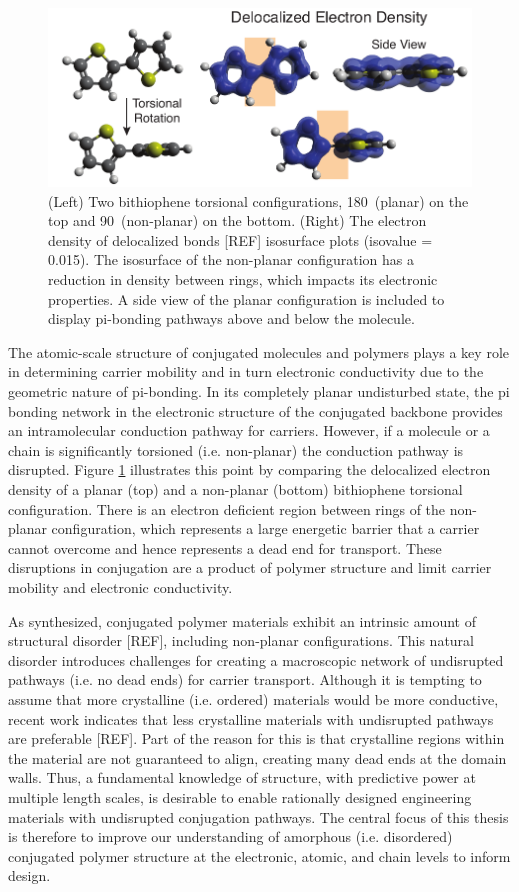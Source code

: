 \begin{figure}[hbt!]
  \includegraphics{figures/chap1_intro/figure_delocal_copy.pdf}
  \caption{(Left) Two bithiophene torsional configurations, 180\textdegree \  (planar) on the top and 90\textdegree \ (non-planar) on the bottom. (Right) The electron density of delocalized bonds [REF] isosurface plots (isovalue = 0.015). The isosurface of the non-planar configuration has a reduction in density between rings, which impacts its electronic properties. A side view of the planar configuration is included to display pi-bonding pathways above and below the molecule.}
  \label{fig:eddb}
\end{figure}

The atomic-scale structure of conjugated molecules and polymers plays a key role in determining carrier mobility and in turn electronic conductivity due to the geometric nature of pi-bonding. In its completely planar undisturbed state, the pi bonding network in the electronic structure of the conjugated backbone provides an intramolecular conduction pathway for carriers. However, if a molecule or a chain is significantly torsioned (i.e. non-planar) the conduction pathway is disrupted. Figure \ref{fig:eddb} illustrates this point by comparing the delocalized electron density of a planar (top) and a non-planar (bottom) bithiophene torsional configuration. There is an electron deficient region between rings of the non-planar configuration, which represents a large energetic barrier that a carrier cannot overcome and hence represents a dead end for transport. These disruptions in conjugation are a product of polymer structure and limit carrier mobility and electronic conductivity.

As synthesized, conjugated polymer materials exhibit an intrinsic amount of structural disorder [REF], including non-planar configurations. This natural disorder introduces challenges for creating a macroscopic network of undisrupted pathways (i.e. no dead ends) for carrier transport. Although it is tempting to assume that more crystalline (i.e. ordered) materials would be more conductive, recent work indicates that less crystalline materials with undisrupted pathways are preferable [REF]. Part of the reason for this is that crystalline regions within the material are not guaranteed to align, creating many dead ends at the domain walls. Thus, a fundamental knowledge of structure, with predictive power at multiple length scales, is desirable to enable rationally designed engineering materials with undisrupted conjugation pathways. The central focus of this thesis is therefore to improve our understanding of amorphous (i.e. disordered) conjugated polymer structure at the electronic, atomic, and chain levels to inform design.

